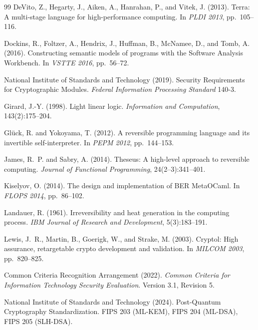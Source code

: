 \documentclass[11pt,a4paper]{article}
\begin{document}
\begin{thebibliography}{99}
DeVito, Z., Hegarty, J., Aiken, A., Hanrahan, P., and Vitek, J. (2013).
\newblock Terra: A multi-stage language for high-performance computing.
\newblock In \emph{PLDI 2013}, pp.~105--116.

Dockins, R., Foltzer, A., Hendrix, J., Huffman, B., McNamee, D., and Tomb, A. (2016).
\newblock Constructing semantic models of programs with the Software Analysis Workbench.
\newblock In \emph{VSTTE 2016}, pp.~56--72.

{National Institute of Standards and Technology} (2019).
\newblock Security Requirements for Cryptographic Modules.
\newblock \emph{Federal Information Processing Standard} 140-3.

Girard, J.-Y. (1998).
\newblock Light linear logic.
\newblock \emph{Information and Computation}, 143(2):175--204.

Gl\"{u}ck, R. and Yokoyama, T. (2012).
\newblock A reversible programming language and its invertible self-interpreter.
\newblock In \emph{PEPM 2012}, pp.~144--153.

James, R.~P. and Sabry, A. (2014).
\newblock Theseus: A high-level approach to reversible computing.
\newblock \emph{Journal of Functional Programming}, 24(2--3):341--401.

Kiselyov, O. (2014).
\newblock The design and implementation of BER MetaOCaml.
\newblock In \emph{FLOPS 2014}, pp.~86--102.

Landauer, R. (1961).
\newblock Irreversibility and heat generation in the computing process.
\newblock \emph{IBM Journal of Research and Development}, 5(3):183--191.

Lewis, J.~R., Martin, B., Goerigk, W., and Strake, M. (2003).
\newblock Cryptol: High assurance, retargetable crypto development and validation.
\newblock In \emph{MILCOM 2003}, pp.~820--825.

{Common Criteria Recognition Arrangement} (2022).
\newblock \emph{Common Criteria for Information Technology Security Evaluation}.
\newblock Version 3.1, Revision 5.

{National Institute of Standards and Technology} (2024).
\newblock Post-Quantum Cryptography Standardization.
\newblock FIPS 203 (ML-KEM), FIPS 204 (ML-DSA), FIPS 205 (SLH-DSA).


\end{thebibliography}
\end{document}
